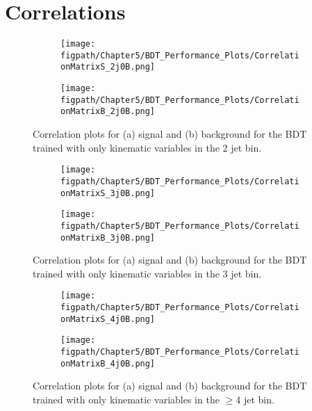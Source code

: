 \section{Correlations}
\label{appendix:BDT_Correlations}

\begin{figure}[!hbt]
    \centering
    \begin{subfigure}[t]{0.48\textwidth}
        \texttt{[image: \\figpath/Chapter5/BDT\_Performance\_Plots/CorrelationMatrixS\_2j0B.png]}
        \caption{}
        \label{fig:KinBDT_jets2_CorrelationS}
    \end{subfigure}
    \begin{subfigure}[t]{0.48\textwidth}
        \texttt{[image: \\figpath/Chapter5/BDT\_Performance\_Plots/CorrelationMatrixB\_2j0B.png]}
        \caption{}
        \label{fig:KinBDT_jets2_CorrelationB}
    \end{subfigure}
    \caption{Correlation plots for (a) signal and (b) background for the BDT trained with only kinematic variables in the 2 jet bin.}
    \label{fig:KinBDT_jets2_Correlations}
\end{figure}

\begin{figure}[!hbt]
    \centering
    \begin{subfigure}[t]{0.48\textwidth}
        \texttt{[image: \\figpath/Chapter5/BDT\_Performance\_Plots/CorrelationMatrixS\_3j0B.png]}
        \caption{}
        \label{fig:KinBDT_jets3_CorrelationS}
    \end{subfigure}
    \begin{subfigure}[t]{0.48\textwidth}
        \texttt{[image: \\figpath/Chapter5/BDT\_Performance\_Plots/CorrelationMatrixB\_3j0B.png]}
        \caption{}
        \label{fig:KinBDT_jets3_CorrelationB}
    \end{subfigure}
    \caption{Correlation plots for (a) signal and (b) background for the BDT trained with only kinematic variables in the 3 jet bin.}
    \label{fig:KinBDT_jets3_Correlations}
\end{figure}

\begin{figure}[!hbt]
    \centering
    \begin{subfigure}[t]{0.48\textwidth}
        \texttt{[image: \\figpath/Chapter5/BDT\_Performance\_Plots/CorrelationMatrixS\_4j0B.png]}
        \caption{}
        \label{fig:KinBDT_jets4_CorrelationS}
    \end{subfigure}
    \begin{subfigure}[t]{0.48\textwidth}
        \texttt{[image: \\figpath/Chapter5/BDT\_Performance\_Plots/CorrelationMatrixB\_4j0B.png]}
        \caption{}
        \label{fig:KinBDT_jets4_CorrelationB}
    \end{subfigure}
    \caption{Correlation plots for (a) signal and (b) background for the BDT trained with only kinematic variables in the $\geqslant$4 jet bin.}
    \label{fig:KinBDT_jets4_Correlations}
\end{figure}

